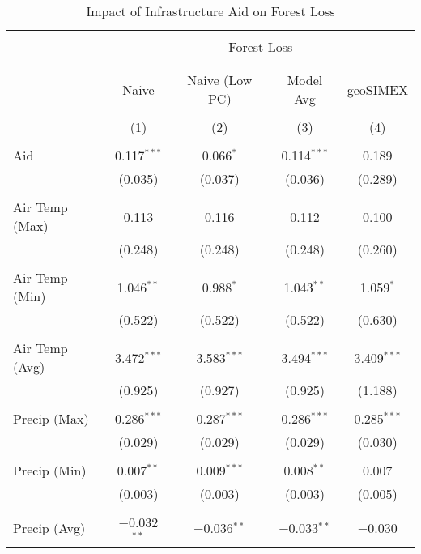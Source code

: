 \newpage
\begin{table}[!htbp] \centering 
  \caption{Impact of Infrastructure Aid on Forest Loss} 
  \label{} 
\begin{tabular}{@{\extracolsep{5pt}}lcccc} 
\\[-1.8ex]\hline 
\hline \\[-1.8ex] 
 & \multicolumn{4}{c}{Forest Loss} \\ 
\cline{2-5} 
\\[-1.8ex] & \multicolumn{4}{c}{} \\ 
 & Naive & Naive (Low PC) & Model Avg & geoSIMEX \\ 
\\[-1.8ex] & (1) & (2) & (3) & (4)\\ 
\hline \\[-1.8ex] 
 Aid & 0.117$^{***}$ & 0.066$^{*}$ & 0.114$^{***}$ & 0.189 \\ 
  & (0.035) & (0.037) & (0.036) & (0.289) \\ 
  & & & & \\ 
 Air Temp (Max) & 0.113 & 0.116 & 0.112 & 0.100 \\ 
  & (0.248) & (0.248) & (0.248) & (0.260) \\ 
  & & & & \\ 
 Air Temp (Min) & 1.046$^{**}$ & 0.988$^{*}$ & 1.043$^{**}$ & 1.059$^{*}$ \\ 
  & (0.522) & (0.522) & (0.522) & (0.630) \\ 
  & & & & \\ 
 Air Temp (Avg) & 3.472$^{***}$ & 3.583$^{***}$ & 3.494$^{***}$ & 3.409$^{***}$ \\ 
  & (0.925) & (0.927) & (0.925) & (1.188) \\ 
  & & & & \\ 
 Precip (Max) & 0.286$^{***}$ & 0.287$^{***}$ & 0.286$^{***}$ & 0.285$^{***}$ \\ 
  & (0.029) & (0.029) & (0.029) & (0.030) \\ 
  & & & & \\ 
 Precip  (Min) & 0.007$^{**}$ & 0.009$^{***}$ & 0.008$^{**}$ & 0.007 \\ 
  & (0.003) & (0.003) & (0.003) & (0.005) \\ 
  & & & & \\ 
 Precip  (Avg) & $-$0.032$^{**}$ & $-$0.036$^{**}$ & $-$0.033$^{**}$ & $-$0.030 \\ 

\end{tabular}
\end{table}
